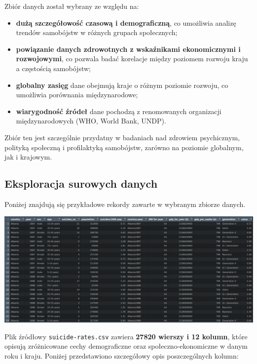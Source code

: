 \documentclass[polish]{article}
\begin{document}
    Zbiór danych został wybrany ze względu na:

    \begin{itemize}
        \item \textbf{dużą szczegółowość czasową i demograficzną}, co umożliwia analizę trendów samobójstw w różnych grupach społecznych;
        \item \textbf{powiązanie danych zdrowotnych z wskaźnikami ekonomicznymi i rozwojowymi}, co pozwala badać korelacje między poziomem rozwoju kraju a częstością samobójstw;
        \item \textbf{globalny zasięg} \textendash \hspace{1mm} dane obejmują kraje o różnym poziomie rozwoju, co umożliwia porównania międzynarodowe;
        \item \textbf{wiarygodność źródeł} \textendash \hspace{1mm} dane pochodzą z renomowanych organizacji międzynarodowych (WHO, World Bank, UNDP).
    \end{itemize}

    Zbiór ten jest szczególnie przydatny w badaniach nad zdrowiem psychicznym, polityką społeczną i profilaktyką samobójstw, zarówno na poziomie globalnym, jak i krajowym.

    \newpage

    \subsection{Eksploracja surowych danych}

    Poniżej znajdują się przykładowe rekordy zawarte w wybranym zbiorze danych.

    \begin{center}
        \includegraphics*[scale=0.3]{img/tabela_rawdata.png}
    \end{center}

    Plik źródłowy \texttt{suicide-rates.csv} zawiera \textbf{27820 wierszy i 12 kolumn}, które opisują zróżnicowane cechy demograficzne oraz społeczno-ekonomiczne w danym roku i kraju. Poniżej przedstawiono szczegółowy opis poszczególnych kolumn:
\end{document}
